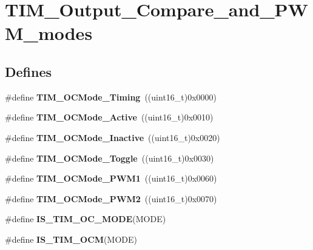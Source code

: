 \hypertarget{group__TIM__Output__Compare__and__PWM__modes}{
\section{TIM\_\-Output\_\-Compare\_\-and\_\-PWM\_\-modes}
\label{group__TIM__Output__Compare__and__PWM__modes}
}
\subsection*{Defines}
\begin{DoxyCompactItemize}
\item 
\hypertarget{group__TIM__Output__Compare__and__PWM__modes_ga54d5745fade3b2f8ea1325e7447ca760}{
\#define {\bfseries TIM\_\-OCMode\_\-Timing}~((uint16\_\-t)0x0000)}
\label{group__TIM__Output__Compare__and__PWM__modes_ga54d5745fade3b2f8ea1325e7447ca760}

\item 
\hypertarget{group__TIM__Output__Compare__and__PWM__modes_ga76bac57d41dc67218772f9c745c77102}{
\#define {\bfseries TIM\_\-OCMode\_\-Active}~((uint16\_\-t)0x0010)}
\label{group__TIM__Output__Compare__and__PWM__modes_ga76bac57d41dc67218772f9c745c77102}

\item 
\hypertarget{group__TIM__Output__Compare__and__PWM__modes_gae0c350d7adaea14a37cabc2ab762695f}{
\#define {\bfseries TIM\_\-OCMode\_\-Inactive}~((uint16\_\-t)0x0020)}
\label{group__TIM__Output__Compare__and__PWM__modes_gae0c350d7adaea14a37cabc2ab762695f}

\item 
\hypertarget{group__TIM__Output__Compare__and__PWM__modes_ga8b8adb6e81fe88bd14d44430f7f97021}{
\#define {\bfseries TIM\_\-OCMode\_\-Toggle}~((uint16\_\-t)0x0030)}
\label{group__TIM__Output__Compare__and__PWM__modes_ga8b8adb6e81fe88bd14d44430f7f97021}

\item 
\hypertarget{group__TIM__Output__Compare__and__PWM__modes_gaefbe32dddc9630fbcc48b302b50d15fc}{
\#define {\bfseries TIM\_\-OCMode\_\-PWM1}~((uint16\_\-t)0x0060)}
\label{group__TIM__Output__Compare__and__PWM__modes_gaefbe32dddc9630fbcc48b302b50d15fc}

\item 
\hypertarget{group__TIM__Output__Compare__and__PWM__modes_ga722d8f33a795ef82ed7ae76dfbb7613d}{
\#define {\bfseries TIM\_\-OCMode\_\-PWM2}~((uint16\_\-t)0x0070)}
\label{group__TIM__Output__Compare__and__PWM__modes_ga722d8f33a795ef82ed7ae76dfbb7613d}

\item 
\#define {\bfseries IS\_\-TIM\_\-OC\_\-MODE}(MODE)
\item 
\#define {\bfseries IS\_\-TIM\_\-OCM}(MODE)
\end{DoxyCompactItemize}


